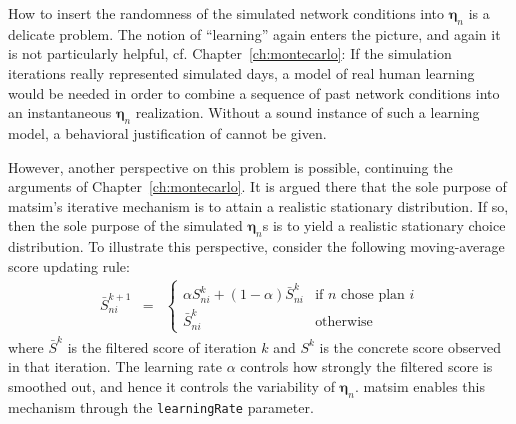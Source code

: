 %
%
%
How to insert the randomness of the simulated network conditions into
$\boldsymbol{\eta}_n$ is a delicate problem.
%
%
The notion of {}``learning'' again
enters the picture, and again it is not particularly helpful, cf.
Chapter~\ref{ch:montecarlo}: If the simulation iterations really represented
simulated days, a model of real human learning would be needed in
order to combine a sequence of past network conditions into an instantaneous
$\boldsymbol{\eta}_n$ realization. Without a sound instance of such a learning model,
a behavioral justification of  cannot
be given.

However, another perspective on this problem is possible, continuing
the arguments of Chapter~\ref{ch:montecarlo}. It is argued there that
the sole purpose of \gls{matsim}'s iterative mechanism is to attain a realistic
stationary distribution. If so, then the sole purpose of the simulated
$\boldsymbol{\eta}_n$s is to yield a realistic stationary choice distribution. To
illustrate this perspective, consider the following moving-average score
updating rule:
\begin{eqnarray}
\bar{S}_{ni}^{k+1} & = & \begin{cases}
\alpha S_{ni}^{k} + (1 - \alpha)\bar{S}_{ni}^{k} & \text{if }n\text{ chose plan }i\\
\bar{S}_{ni}^{k} & \text{otherwise}
\end{cases}
\end{eqnarray}
where $\bar{S}^{k}$ is the filtered score of iteration $k$ and $S^{k}$
is the concrete score observed in that iteration. The learning rate $\alpha$
controls how strongly the filtered score is smoothed out, and hence
it controls the variability of $\boldsymbol{\eta}_n$. \gls{matsim} enables this mechanism
through the \lstinline{learningRate} parameter.
%

